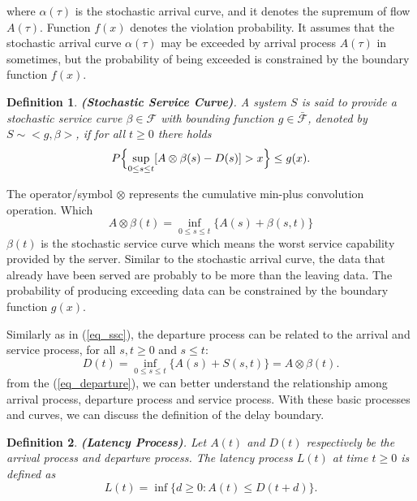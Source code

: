\documentclass[conference]{IEEEtran}
\newtheorem{definition}{\textbf{Definition}}
\begin{document}
where $\alpha(\tau)$ is the stochastic arrival curve, and it denotes the supremum of flow $A(\tau)$. Function $f(x)$ denotes the violation probability. It assumes that the stochastic arrival curve $\alpha(\tau)$ may be exceeded by arrival process $A(\tau)$ in sometimes, but the probability of being exceeded is constrained by the boundary function $f(x)$.

\begin{definition}\label{def_SSC}
{\bfseries(Stochastic Service Curve)}. A system $S$ is said to provide a stochastic service curve $\beta\in\mathcal{F}$ with bounding function $g \in \mathcal{\bar{F}}$, denoted by $S \sim<g, \beta>$, if for all $t\geq0$ there holds
\begin{equation}\label{eq_ssc}
P\Bigl\{\sup_{0\leq s \leq t}[A\otimes\beta(s) - D(s)] > x \Bigr\} \leq g(x).
\end{equation}
\end{definition}

The operator/symbol $\otimes$ represents the cumulative min-plus convolution operation. Which
\begin{equation}\label{eq_convolution}
A\otimes\beta(t) = \inf_{0 \leqslant s \leqslant t}\{A(s)+\beta(s,t)\}
\end{equation}
$\beta(t)$ is the stochastic service curve which means the worst service capability provided by the server. Similar to the stochastic arrival curve, the data that already have been served are probably to be more than the leaving data. The probability of producing exceeding data can be constrained by the boundary function $g(x)$.

Similarly as in (\ref{eq_ssc}), the departure process can be related to the arrival and service process, for all $s,t \geqslant 0$ and $s \leqslant t$:
\begin{equation}\label{eq_departure}
D(t) = \inf_{0\leqslant s \leqslant t}\{A(s)+ S(s,t)\} =  A \otimes \beta(t).
\end{equation}
from the (\ref{eq_departure}), we can better understand the relationship among arrival process, departure process and service process. With these basic processes and curves, we can discuss the definition of the delay boundary.

\begin{definition}
{\bfseries(Latency Process)}.
Let $A(t)$ and $D(t)$ respectively be the arrival process and departure process. The latency process $L(t)$ at time $t \geq 0$ is defined as
\begin{equation}\label{eq_delay_define}
L(t) = \inf\{d \geq 0 : A(t) \leq D(t+d)\}.
\end{equation}
\end{definition}
\end{document}
